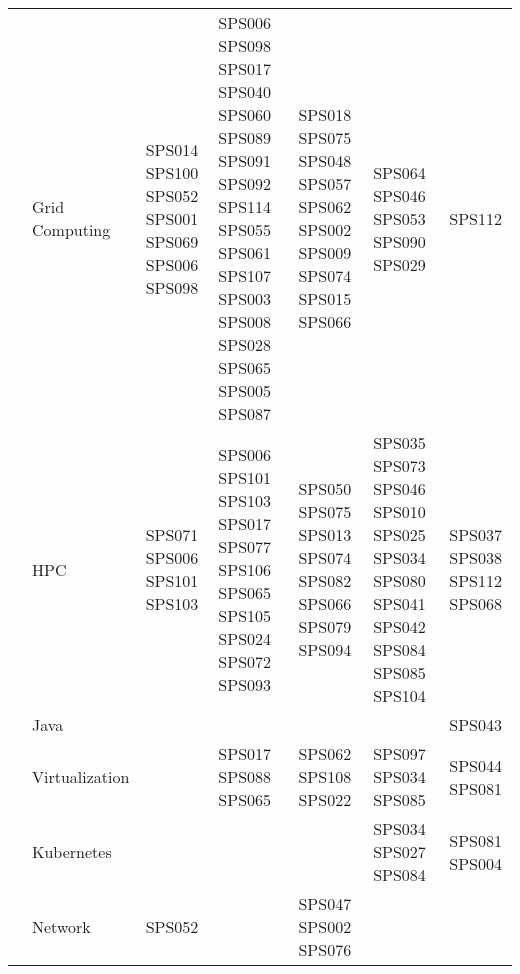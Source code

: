 \begin{table}
{\begin{tabular}{p{0.8cm}p{1.5cm}p{2.8cm}p{2.8cm}p{2.8cm}p{2.8cm}p{2.8cm}}
			                        & Grid \hbox{Computing}   & SPS014 SPS100 SPS052 SPS001 SPS069 SPS006 SPS098        & SPS006 SPS098 SPS017 SPS040 SPS060 SPS089 SPS091 SPS092 SPS114 SPS055 SPS061 SPS107 SPS003 SPS008 SPS028 SPS065 SPS005 SPS087 & SPS018 SPS075 SPS048 SPS057 SPS062 SPS002 SPS009 SPS074 SPS015 SPS066                      & SPS064 SPS046 SPS053 SPS090 SPS029                                                  & SPS112                             \\[3.0em]
			                        & HPC                     & SPS071 SPS006 SPS101 SPS103                             & SPS006 SPS101 SPS103 SPS017 SPS077 SPS106 SPS065 SPS105 SPS024 SPS072 SPS093                                                  & SPS050 SPS075 SPS013 SPS074 SPS082 SPS066 SPS079 SPS094                                    & SPS035 SPS073 SPS046 SPS010 SPS025 SPS034 SPS080 SPS041 SPS042 SPS084 SPS085 SPS104 & SPS037 SPS038 SPS112 SPS068        \\[3.0em]
			                        & Java                    &                                                         &                                                                                                                               &                                                                                            &                                                                                     & SPS043                             \\[3.0em]
			                        & Virtualization          &                                                         & SPS017 SPS088 SPS065                                                                                                          & SPS062 SPS108 SPS022                                                                       & SPS097 SPS034 SPS085                                                                & SPS044 SPS081                      \\[3.0em]
			                        & Kubernetes              &                                                         &                                                                                                                               &                                                                                            & SPS034 SPS027 SPS084                                                                & SPS081 SPS004                      \\[3.0em]
			                        & Network                 & SPS052                                                  &                                                                                                                               & SPS047 SPS002 SPS076                                                                       &                                                                                     &                                    \\[3.0em]

\end{tabular}}
\end{table}
